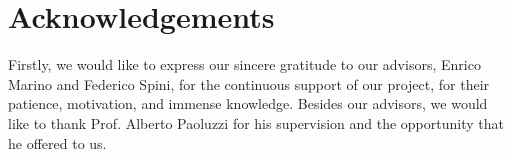 \chapter{Acknowledgements}
\label{cha:acknowledgements}
Firstly, we would like to express our sincere gratitude to our advisors, Enrico Marino and Federico Spini, for the continuous support of our project, for their patience, motivation, and immense knowledge. Besides our advisors, we would like to thank Prof. Alberto Paoluzzi for his supervision and the opportunity that he offered to us.